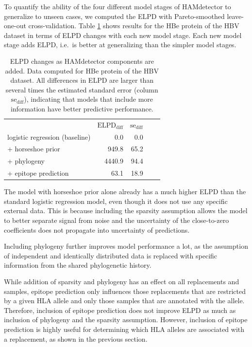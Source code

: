 \documentclass{bioinfo}
\begin{document}
To quantify the ability of the four different model stages of HAMdetector to generalize to unseen cases, we computed the ELPD with Pareto-smoothed leave-one-out cross-validation. Table \ref{loo} shows results for the HBe protein of the HBV dataset in terms of ELPD changes with each new model stage. Each new model stage adds ELPD, i.e.\ is better at generalizing than the simpler model stages.

\begin{table}[h!]
  \renewcommand{\arraystretch}{1.3}
  \centering
  \caption{ELPD changes as HAMdetector components are added. Data computed for HBe protein of the HBV dataset. All differences in ELPD are larger than several times the estimated standard error (column \(\text{se}_\text{diff}\)), indicating that models that include more information have better predictive performance.}
  \vspace{0.5cm}
  \begin{tabular}{l|r|rll}
  \multicolumn{1}{l|}{} & \multicolumn{1}{c|}{\(\text{ELPD}_\text{diff}\)} & \multicolumn{1}{c}{\(\text{se}_\text{diff}\)} &  &  \\ \cline{1-3}
  logistic regression (baseline) & 0.0  & 0.0 &  &  \\
  + horseshoe prior     & 949.8  & 65.2 &  &  \\
  + phylogeny & 4440.9 & 94.4 &  &  \\
  + epitope prediction & 63.1   & 18.9 &  & 
  \end{tabular}
  \label{loo}
\end{table}


The model with horseshoe prior alone already has a much higher ELPD than the standard logistic regression model, even though it does not use any specific external data. This is because including the sparsity assumption allows the model to better separate signal from noise and the uncertainty of the close-to-zero coefficients does not propagate into uncertainty of predictions.

Including phylogeny further improves model performance a lot, as the assumption of independent and identically distributed data is replaced with specific information from the shared phylogenetic history.

While addition of sparsity and phylogeny has an effect on all replacements and samples, epitope prediction only influences those replacements that are restricted by a given HLA allele and only those samples that are annotated with the allele. Therefore, inclusion of epitope prediction does not improve ELPD as much as inclusion of phylogeny and the sparsity assumption. However, inclusion of epitope prediction is highly useful for determining which HLA alleles are associated with a replacement, as shown in the previous section.
\end{document}
